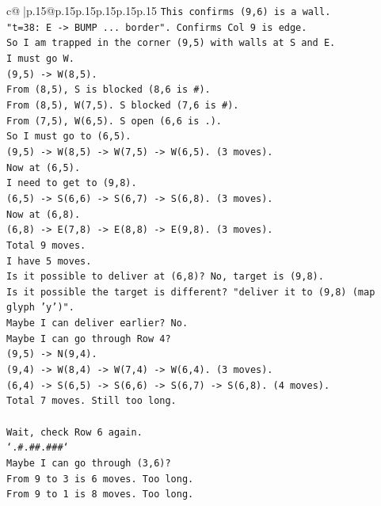 \documentclass{article}
\begin{document}
{\begin{supertabular}{c@{$\;$}|p{.15\linewidth}@{}p{.15\linewidth}p{.15\linewidth}p{.15\linewidth}p{.15\linewidth}p{.15\linewidth}}
{{{\texttt{This confirms (9,6) is a wall.} \\
\texttt{"t=38: E {-}> BUMP ... border". Confirms Col 9 is edge.} \\
\texttt{So I am trapped in the corner (9,5) with walls at S and E.} \\
\texttt{I must go W.} \\
\texttt{(9,5) {-}> W(8,5).} \\
\texttt{From (8,5), S is blocked (8,6 is \#).} \\
\texttt{From (8,5), W(7,5). S blocked (7,6 is \#).} \\
\texttt{From (7,5), W(6,5). S open (6,6 is .).} \\
\texttt{So I must go to (6,5).} \\
\texttt{(9,5) {-}> W(8,5) {-}> W(7,5) {-}> W(6,5). (3 moves).} \\
\texttt{Now at (6,5).} \\
\texttt{I need to get to (9,8).} \\
\texttt{(6,5) {-}> S(6,6) {-}> S(6,7) {-}> S(6,8). (3 moves).} \\
\texttt{Now at (6,8).} \\
\texttt{(6,8) {-}> E(7,8) {-}> E(8,8) {-}> E(9,8). (3 moves).} \\
\texttt{Total 9 moves.} \\
\texttt{I have 5 moves.} \\
\texttt{Is it possible to deliver at (6,8)? No, target is (9,8).} \\
\texttt{Is it possible the target is different? "deliver it to (9,8) (map glyph 'y')".} \\
\texttt{Maybe I can deliver earlier? No.} \\
\texttt{Maybe I can go through Row 4?} \\
\texttt{(9,5) {-}> N(9,4).} \\
\texttt{(9,4) {-}> W(8,4) {-}> W(7,4) {-}> W(6,4). (3 moves).} \\
\texttt{(6,4) {-}> S(6,5) {-}> S(6,6) {-}> S(6,7) {-}> S(6,8). (4 moves).} \\
\texttt{Total 7 moves. Still too long.} \\
\\ 
\texttt{Wait, check Row 6 again.} \\
\texttt{`.\#.\#\#.\#\#\#`} \\
\texttt{Maybe I can go through (3,6)?} \\
\texttt{From 9 to 3 is 6 moves. Too long.} \\
\texttt{From 9 to 1 is 8 moves. Too long.} \\
}}}
\end{supertabular}}
\end{document}
